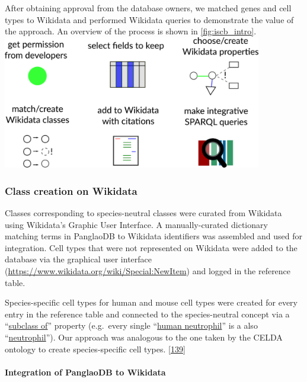 After obtaining approval from the database owners, we matched genes and cell types to Wikidata and performed Wikidata queries to demonstrate the value of the approach.
An overview of the process is shown in \ref{fig:iscb_intro}.
\includegraphics[width=0.85\textwidth,height=\textheight]{images/poster_ISCB_intro.png}

\hypertarget{class-creation-on-wikidata}{%
\subsubsection{Class creation on Wikidata}\label{class-creation-on-wikidata}}

Classes corresponding to species-neutral classes were curated from Wikidata using Wikidata's Graphic User Interface.
A manually-curated dictionary matching terms in PanglaoDB to Wikidata identifiers was assembled and used for integration.
Cell types that were not represented on Wikidata were added to the database via the graphical user interface (\url{https://www.wikidata.org/wiki/Special:NewItem}) and logged in the reference table.

Species-specific cell types for human and mouse cell types were created for every entry in the reference table and connected to the species-neutral concept via a ``\href{http://www.wikidata.org/entity/P279}{subclass of}'' property (e.g.~every single ``\href{http://www.wikidata.org/entity/Q101405102}{human neutrophil}'' is a also ``\href{http://www.wikidata.org/entity/Q188417}{neutrophil}'').
Our approach was analogous to the one taken by the CELDA ontology to create species-specific cell types. {[}\protect\hyperlink{ref-RLHsA1U8}{139}{]}

\hypertarget{integration-of-panglaodb-to-wikidata}{%
\paragraph{Integration of PanglaoDB to Wikidata}\label{integration-of-panglaodb-to-wikidata}}

